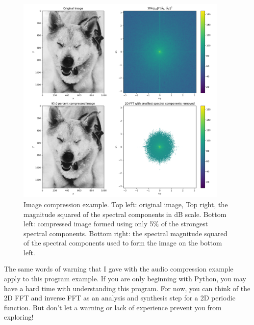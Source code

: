 \begin{figure}
\begin{center}
\includegraphics[width=0.93\textwidth]{Applications/figures/image_compression.png}
\end{center}
\caption{Image compression example. Top left: original image, Top
  right, the magnitude squared of the spectral components in dB
  scale. Bottom left: compressed image formed using only 5\% of the
  strongest spectral components. Bottom right: the spectral magnitude
  squared of the spectral components used to form the image on the
  bottom left.}
\label{fig:image_compression}
\end{figure}

The same words of warning that I gave with the audio compression
example apply to this program example. If you are only beginning with
Python, you may have a hard time with understanding this program. For now, you can think of the 2D FFT and inverse FFT as an analysis and synthesis step for a 2D
periodic function. But don't let a warning or lack of experience
prevent you from exploring!


